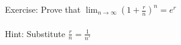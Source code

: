 \documentclass[preview]{standalone}
\begin{document}
\begin{center}
Exercise: Prove that $\lim_{n \to \infty} (1 + \frac rn)^n = e^r$ \\ \\ Hint: Substitute $\frac rn = \frac {1}{n'}$
\end{center}
\end{document}
